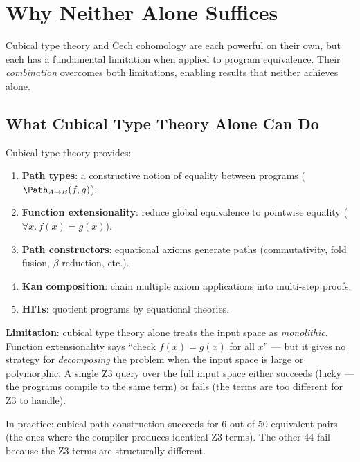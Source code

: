 
\chapter{Why Neither Alone Suffices}
\label{ch:neither-alone}

Cubical type theory and \v{C}ech cohomology are each powerful on their
own, but each has a fundamental limitation when applied to program
equivalence.  Their \emph{combination} overcomes both limitations,
enabling results that neither achieves alone.

\section{What Cubical Type Theory Alone Can Do}

Cubical type theory provides:
\begin{enumerate}
  \item \textbf{Path types}: a constructive notion of equality between
    programs ($\Path_{A \to B}(f, g)$).
  \item \textbf{Function extensionality}: reduce global equivalence to
    pointwise equality ($\forall x.\, f(x) = g(x)$).
  \item \textbf{Path constructors}: equational axioms generate paths
    (commutativity, fold fusion, $\beta$-reduction, etc.).
  \item \textbf{Kan composition}: chain multiple axiom applications
    into multi-step proofs.
  \item \textbf{HITs}: quotient programs by equational theories.
\end{enumerate}

\textbf{Limitation}: cubical type theory alone treats the input space
as \emph{monolithic}.  Function extensionality says ``check $f(x) =
g(x)$ for all $x$'' --- but it gives no strategy for \emph{decomposing}
the problem when the input space is large or polymorphic.  A single
Z3 query over the full input space either succeeds (lucky --- the
programs compile to the same term) or fails (the terms are too
different for Z3 to handle).

In practice: cubical path construction succeeds for 6 out of 50
equivalent pairs (the ones where the compiler produces identical Z3
terms).  The other 44 fail because the Z3 terms are structurally
different.

